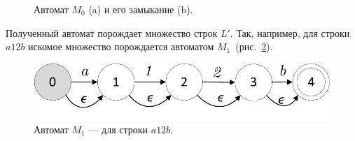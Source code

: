 \documentclass[14pt]{matmex-diploma-custom}
\begin{document}
	
	\begin{figure}
		\centering
		
		\caption{Автомат $M_0$ (a) и его замыкание (b).}
		\label{fig:am0}
	\end{figure}
	
	Полученный автомат порождает множество строк $L'$. Так, например, для строки $a12b$ искомое множество порождается автоматом $M_1$~(рис.~\ref{fig:M1}).
    \begin{figure}
    	\centering
    	\includegraphics[scale=.6]{pictures/M1Automaton.pdf}
    	\caption{Автомат $M_1$ --- для строки $ a12b $.}
    	\label{fig:M1}
    \end{figure}
    
\end{document}
